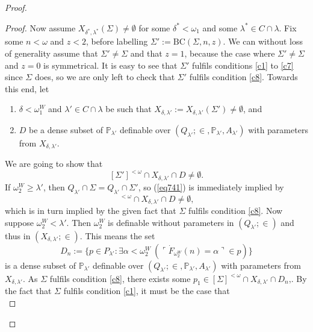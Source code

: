 \documentclass[12pt, twoside]{memoir}
\numberwithin{equation}{section}
\theoremstyle{definition}
\theoremstyle{remark}
\theoremstyle{definition}
\theoremstyle{definition}
\theoremstyle{definition}
\theoremstyle{remark}
\begin{document}
\begin{proof}
\begin{proof}
Now assume $X_{\delta^*, \lambda^*}(\Sigma) \neq \emptyset$ for some $\delta^* < \omega_1$ and some $\lambda^* \in C \cap \lambda$. Fix some $n < \omega$ and $z < 2$, before labelling $\Sigma' := \mathrm{BC}(\Sigma, n, z)$. We can without loss of generality assume that $\Sigma' \neq \Sigma$ and that $z = 1$, because the case where $\Sigma' \neq \Sigma$ and $z = 0$ is symmetrical. It is easy to see that $\Sigma'$ fulfils conditions \ref{c1} to \ref{c7} since $\Sigma$ does, so we are only left to check that $\Sigma'$ fulfils condition \ref{c8}. Towards this end, let
\begin{enumerate}[label=(\arabic*)]
    \item\label{74111} $\delta < \omega_1^W$ and $\lambda' \in C \cap \lambda$ be such that $X_{\delta, \lambda'} := X_{\delta, \lambda'}(\Sigma') \neq \emptyset$, and
    \item\label{74112} $D$ be a dense subset of $\mathbb{P}_{\lambda'}$ definable over $(Q_{\lambda'}; \in, \mathbb{P}_{\lambda'}, A_{\lambda'})$ with parameters from $X_{\delta, \lambda'}$.
\end{enumerate}
We are going to show that
\begin{equation}\label{eq741}
    [\Sigma']^{< \omega} \cap X_{\delta, \lambda'} \cap D \neq \emptyset \text{.}
\end{equation}
If $\omega_2^W \geq \lambda'$, then $Q_{\lambda'} \cap \Sigma = Q_{\lambda'} \cap \Sigma'$, so (\ref{eq741}) is immediately implied by
\begin{equation*}
    [\Sigma]^{< \omega} \cap X_{\delta, \lambda'} \cap D \neq \emptyset \text{,}
\end{equation*}
which is in turn implied by the given fact that $\Sigma$ fulfils condition \ref{c8}. Now suppose $\omega_2^W < \lambda'$. Then $\omega_2^W$ is definable without parameters in $(Q_{\lambda'}; \in)$ and thus in $(X_{\delta, \lambda'}; \in)$. This means the set
\begin{equation*}
    D_n := \{p \in P_{\lambda'} : \exists \alpha < \omega_2^W \ (\ulcorner \dot{F}_{\omega_2^W}(n) = \alpha \urcorner \in p)\}
\end{equation*}
is a dense subset of $\mathbb{P}_{\lambda'}$ definable over $(Q_{\lambda'}; \in, \mathbb{P}_{\lambda'}, A_{\lambda'})$ with parameters from $X_{\delta, \lambda'}$. As $\Sigma$ fulfils condition \ref{c8}, there exists some $p_1 \in [\Sigma]^{< \omega} \cap X_{\delta, \lambda'} \cap D_n \text{,}$. By the fact that $\Sigma$ fulfils condition \ref{c1}, it must be the case that 
\begin{equation*}

\end{equation*}
\end{proof}
\end{proof}
\end{document}
